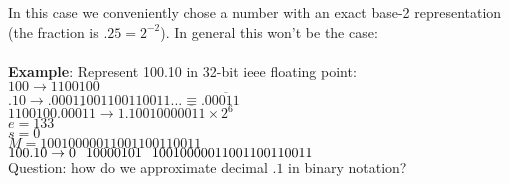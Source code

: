 \documentclass[11pt]{article}
\begin{document}
In this case we conveniently chose a number with an exact base-2 representation (the fraction is $.25 = 2^{-2}$).
In general this won't be the case: \\
\\
{\bf Example}: Represent 100.10 in 32-bit ieee floating point: \\
$100  \rightarrow 1100100$ \\
$.10 \rightarrow  .00011001100110011... \equiv .0\overline{0011}$ \\
$1100100.0\overline{0011} \rightarrow 1.1001000\overline{0011} \times 2^6$ \\
$e=133$ \\
$s = 0$ \\
$M= 10010000011001100110011$ \\
$100.10 \rightarrow 0 \hspace{.1in} 10000101\hspace{.1in} 10010000011001100110011$ \\

\noindent Question: how do we approximate decimal $.1$ in binary notation? \\
\end{document}
